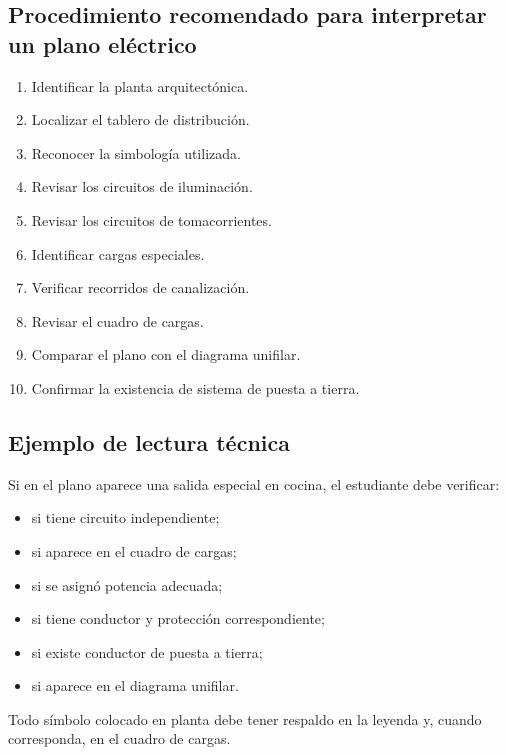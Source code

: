 \documentclass[
  spanish,
  letterpaper,
  DIV=11,
  numbers=noendperiod]{scrreprt}
\providecommand{\tightlist}{%
  \setlength{\itemsep}{0pt}\setlength{\parskip}{0pt}}
\begin{document}
\subsection{Procedimiento recomendado para interpretar un plano
eléctrico}\label{procedimiento-recomendado-para-interpretar-un-plano-eluxe9ctrico}

\begin{enumerate}
\def\labelenumi{\arabic{enumi}.}
\tightlist
\item
  Identificar la planta arquitectónica.
\item
  Localizar el tablero de distribución.
\item
  Reconocer la simbología utilizada.
\item
  Revisar los circuitos de iluminación.
\item
  Revisar los circuitos de tomacorrientes.
\item
  Identificar cargas especiales.
\item
  Verificar recorridos de canalización.
\item
  Revisar el cuadro de cargas.
\item
  Comparar el plano con el diagrama unifilar.
\item
  Confirmar la existencia de sistema de puesta a tierra.
\end{enumerate}

\subsection{Ejemplo de lectura
técnica}\label{ejemplo-de-lectura-tuxe9cnica}

Si en el plano aparece una salida especial en cocina, el estudiante debe
verificar:

\begin{itemize}
\tightlist
\item
  si tiene circuito independiente;
\item
  si aparece en el cuadro de cargas;
\item
  si se asignó potencia adecuada;
\item
  si tiene conductor y protección correspondiente;
\item
  si existe conductor de puesta a tierra;
\item
  si aparece en el diagrama unifilar.
\end{itemize}

\begin{tcolorbox}[enhanced jigsaw, arc=.35mm, bottomrule=.15mm, bottomtitle=1mm, breakable, colback=white, colbacktitle=quarto-callout-tip-color!10!white, colframe=quarto-callout-tip-color-frame, coltitle=black, left=2mm, leftrule=.75mm, opacityback=0, opacitybacktitle=0.6, rightrule=.15mm, title=\textcolor{quarto-callout-tip-color}{\faLightbulb}\hspace{0.5em}{Tip}, titlerule=0mm, toprule=.15mm, toptitle=1mm]

Todo símbolo colocado en planta debe tener respaldo en la leyenda y,
cuando corresponda, en el cuadro de cargas.

\end{tcolorbox}
\end{document}
